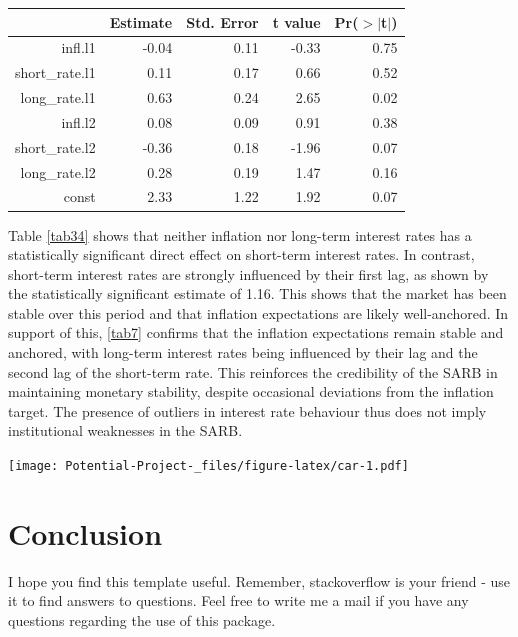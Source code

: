 \documentclass[11pt,preprint]{elsarticle}
\let\origtable\table
\let\endorigtable\endtable
\renewenvironment{table}[1][2] {
    \expandafter\origtable\expandafter[H]
} {
    \endorigtable
}
\numberwithin{equation}{section}
\numberwithin{figure}{section}
\numberwithin{table}{section}
\begin{document}
\begin{table}[ht]
\centering
\begin{tabular}{rrrrr}
  \hline
 & Estimate & Std. Error & t value & Pr($>$$|$t$|$) \\ 
  \hline
infl.l1 & -0.04 & 0.11 & -0.33 & 0.75 \\ 
  short\_rate.l1 & 0.11 & 0.17 & 0.66 & 0.52 \\ 
  long\_rate.l1 & 0.63 & 0.24 & 2.65 & 0.02 \\ 
  infl.l2 & 0.08 & 0.09 & 0.91 & 0.38 \\ 
  short\_rate.l2 & -0.36 & 0.18 & -1.96 & 0.07 \\ 
  long\_rate.l2 & 0.28 & 0.19 & 1.47 & 0.16 \\ 
  const & 2.33 & 1.22 & 1.92 & 0.07 \\ 
   \hline
\end{tabular}
\caption{VAR Equation for Long-Term Interest Rate \label{tab7}} 
\end{table}

Table \ref{tab34} shows that neither inflation nor long-term interest
rates has a statistically significant direct effect on short-term
interest rates. In contrast, short-term interest rates are strongly
influenced by their first lag, as shown by the statistically significant
estimate of 1.16. This shows that the market has been stable over this
period and that inflation expectations are likely well-anchored. In
support of this, \ref{tab7} confirms that the inflation expectations
remain stable and anchored, with long-term interest rates being
influenced by their lag and the second lag of the short-term rate. This
reinforces the credibility of the SARB in maintaining monetary
stability, despite occasional deviations from the inflation target. The
presence of outliers in interest rate behaviour thus does not imply
institutional weaknesses in the SARB.

\texttt{[image: Potential-Project-\_files/figure-latex/car-1.pdf]}
\newpage

\section{Conclusion}\label{conclusion}

I hope you find this template useful. Remember, stackoverflow is your
friend - use it to find answers to questions. Feel free to write me a
mail if you have any questions regarding the use of this package.

\newpage
\end{document}
